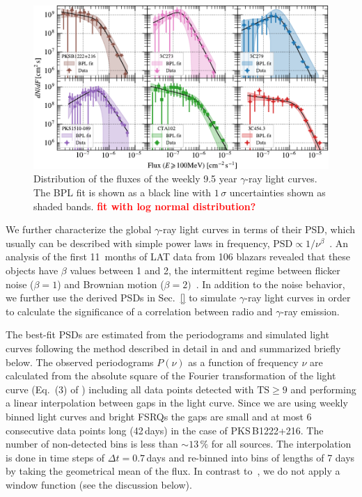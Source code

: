 \documentclass[twocolumn,linenumbers]{aastex62}
\newcommand{\gray}{$\gamma$-ray\xspace}
\newcommand{\todo}[1]{\textbf{\textcolor{red}{#1}}}
\begin{document}
\begin{figure}
    \includegraphics[width = .99\linewidth]{figures/fluxdist_weekly_tsmin9.pdf}
    \caption{\label{fig:fluxpdf} Distribution of the fluxes of the weekly 9.5 year \gray light curves. The BPL fit is shown as a black line with $1\,\sigma$ uncertainties shown as shaded bands. \todo{fit with log normal distribution?}}
\end{figure}

We further characterize the global \gray light curves in terms of their PSD,
which usually can be described with simple power laws in frequency,  $\mathrm{PSD} \propto 1 / \nu^\beta$~\citep{}.
An analysis of the first 11~months of LAT data from 106 blazars revealed that 
these objects have $\beta$ values between 1 and 2, the intermittent regime between flicker noise ($\beta = 1$) and Brownian motion ($\beta = 2)$~\citep{2010ApJ...722..520A}. 
In addition to the noise behavior, 
we further use the derived PSDs in Sec.~\ref{} to simulate \gray light curves in order to calculate the significance of a correlation between radio and \gray emission. 

The best-fit PSDs are estimated from the periodograms and simulated light curves following the method described in detail in \citet{2014MNRAS.445..437M} and \citet{2013MNRAS.433..907E} and summarized briefly below.
The observed periodograms $P(\nu)$ as a function of frequency $\nu$ are calculated from the absolute square of the Fourier transformation of the light curve (Eq.~(3) of \citealt{2014MNRAS.445..437M}) including all 
data points detected with $\mathrm{TS} \geqslant 9$ and performing a linear interpolation between gaps in the light curve. Since we are using weekly binned light curves and bright FSRQs the gaps are small and at most 6 consecutive data points long (42\,days) in the case of PKS\,B1222+216. The number of non-detected bins is less than $\sim13\,\%$ for all sources.
The interpolation is done in time steps of $\Delta t=0.7\,$days and 
 re-binned into bins of lengths of 7 days by taking the geometrical mean of the flux.
In contrast to~\citet{2014MNRAS.445..437M}, we do not apply a window function (see the discussion below). 
\end{document}
